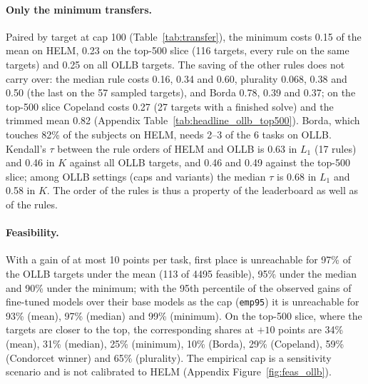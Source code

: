 \paragraph{Only the minimum transfers.}
Paired by target at cap 100 (Table~\ref{tab:transfer}), the minimum costs 0.15 of the mean on HELM, 0.23 on the top-500 slice (116 targets, every rule on the same targets) and 0.25 on all OLLB targets. The saving of the other rules does not carry over: the median rule costs 0.16, 0.34 and 0.60, plurality 0.068, 0.38 and 0.50 (the last on the 57 sampled targets), and Borda 0.78, 0.39 and 0.37; on the top-500 slice Copeland costs 0.27 (27 targets with a finished solve) and the trimmed mean 0.82 (Appendix Table~\ref{tab:headline_ollb_top500}). Borda, which touches 82\% of the subjects on HELM, needs 2--3 of the 6 tasks on OLLB. Kendall's $\tau$ between the rule orders of HELM and OLLB is 0.63 in $L_1$ (17 rules) and 0.46 in $K$ against all OLLB targets, and 0.46 and 0.49 against the top-500 slice; among OLLB settings (caps and variants) the median $\tau$ is 0.68 in $L_1$ and 0.58 in $K$. The order of the rules is thus a property of the leaderboard as well as of the rules.

\begin{table}[t]
\centering
\caption{Does the cost order of the rules carry over from HELM to the Open LLM Leaderboard (OLLB)? Cap 100 (every target feasible). Per target set: median paired ratio $L_1/L_1^{\text{mean}}$ with 95\% bootstrap interval over targets, and median number of tasks touched $K$. $^\dagger$Run on 57 sampled targets only (ratio to the mean on the same 57). $^\ddagger$27 targets with a finished solve out of 30 run. $^*$Condorcet winner: upper bound for Condorcet-consistent rules. Last row: Kendall's $\tau$ between the rule orders ($L_1$ / $K$) of HELM and of the OLLB set, over the rules run in both (including power, weighted and trimmed means not shown).}
\label{tab:transfer}
\scriptsize
\resizebox{\textwidth}{!}{}
\end{table}

\paragraph{Feasibility.}
With a gain of at most 10 points per task, first place is unreachable for 97\% of the OLLB targets under the mean (113 of 4495 feasible), 95\% under the median and 90\% under the minimum; with the 95th percentile of the observed gains of fine-tuned models over their base models as the cap (\texttt{emp95}) it is unreachable for 93\% (mean), 97\% (median) and 99\% (minimum). On the top-500 slice, where the targets are closer to the top, the corresponding shares at $+10$ points are 34\% (mean), 31\% (median), 25\% (minimum), 10\% (Borda), 29\% (Copeland), 59\% (Condorcet winner) and 65\% (plurality). The empirical cap is a sensitivity scenario and is not calibrated to HELM (Appendix Figure~\ref{fig:feas_ollb}).

